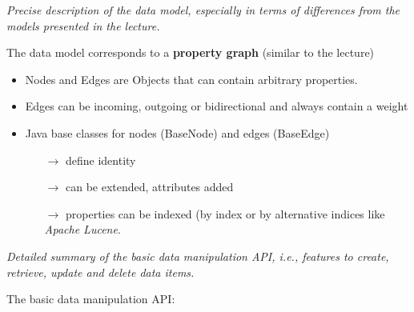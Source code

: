 
\emph{Precise description of the data model, especially in terms of differences from the  models presented in the lecture.}

The data model corresponds to a \textbf{property graph} (similar to the lecture)
\begin{itemize}
	\item Nodes and Edges are Objects that can contain arbitrary properties.
	\item Edges can be incoming, outgoing or bidirectional and always contain a weight
	\item Java base classes for nodes (BaseNode) and edges (BaseEdge)
	\begin{itemize}
		\item[$\rightarrow$] define identity
		\item[$\rightarrow$] can be extended, attributes added
		\item[$\rightarrow$] properties can be indexed (by  index
		or by alternative indices like \textit{Apache Lucene}.
	\end{itemize}
\end{itemize}

\emph{Detailed summary of the basic data manipulation API, i.e., features to create, retrieve, update and delete data items.}

The basic data manipulation API:


